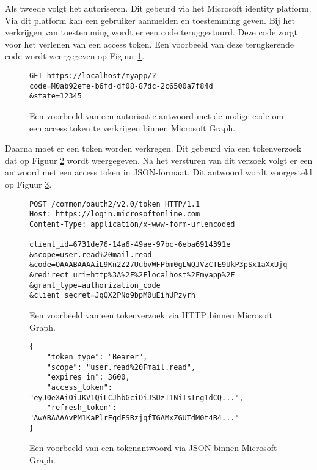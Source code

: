 Als tweede volgt het autoriseren. Dit gebeurd via het Microsoft identity platform. Via dit platform kan een gebruiker aanmelden en toestemming geven. Bij het verkrijgen van toestemming wordt er een code teruggestuurd. Deze code zorgt voor het verlenen van een access token. Een voorbeeld van deze terugkerende code wordt weergegeven op Figuur \ref{MSGAR}. \\

\begin{figure}[h]
    \footnotesize
    \begin{verbatim}
GET https://localhost/myapp/?
code=M0ab92efe-b6fd-df08-87dc-2c6500a7f84d
&state=12345
    \end{verbatim}    
    \caption[Voorbeeld Microsoft Graph Authorization response]{Een voorbeeld van een autorisatie antwoord met de nodige code om een access token te verkrijgen binnen Microsoft Graph.}
    \label{MSGAR}
\end{figure}

Daarna moet er een token worden verkregen. Dit gebeurd via een tokenverzoek dat op Figuur \ref{HTR} wordt weergegeven. Na het versturen van dit verzoek volgt er een antwoord met een access token in \ac{JSON}-formaat. Dit antwoord wordt voorgesteld op Figuur \ref{HTRES}. \\ 

\begin{figure}[!h]
    \footnotesize\begin{verbatim}
POST /common/oauth2/v2.0/token HTTP/1.1
Host: https://login.microsoftonline.com
Content-Type: application/x-www-form-urlencoded
        
client_id=6731de76-14a6-49ae-97bc-6eba6914391e
&scope=user.read%20mail.read
&code=OAAABAAAAiL9Kn2Z27UubvWFPbm0gLWQJVzCTE9UkP3pSx1aXxUjq3n8b2JRLk4OxVXr...
&redirect_uri=http%3A%2F%2Flocalhost%2Fmyapp%2F
&grant_type=authorization_code
&client_secret=JqQX2PNo9bpM0uEihUPzyrh
    \end{verbatim}    
    \caption[Voorbeeld User Token Request Microsoft Graph]{Een voorbeeld van een tokenverzoek via \ac{HTTP} binnen Microsoft Graph.}
    \label{HTR}
\end{figure}

\begin{figure}[!h]
    \footnotesize\begin{verbatim}
{
    "token_type": "Bearer",
    "scope": "user.read%20Fmail.read",
    "expires_in": 3600,
    "access_token": "eyJ0eXAiOiJKV1QiLCJhbGciOiJSUzI1NiIsIng1dCQ...",
    "refresh_token": "AwABAAAAvPM1KaPlrEqdFSBzjqfTGAMxZGUTdM0t4B4..."
}        
    \end{verbatim}    
    \caption[Voorbeeld User Token Response Microsoft Graph]{Een voorbeeld van een tokenantwoord via \ac{JSON} binnen Microsoft Graph.}
    \label{HTRES}
\end{figure}

